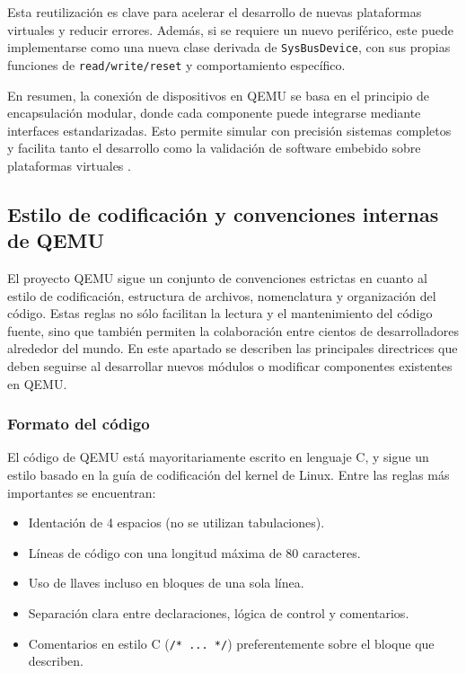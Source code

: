 Esta reutilización es clave para acelerar el desarrollo de nuevas plataformas virtuales y reducir errores. Además, si se requiere un nuevo periférico, este puede implementarse como una nueva clase derivada de \texttt{SysBusDevice}, con sus propias funciones de \texttt{read/write/reset} y comportamiento específico.

\vspace{1em}
En resumen, la conexión de dispositivos en QEMU se basa en el principio de encapsulación modular, donde cada componente puede integrarse mediante interfaces estandarizadas. Esto permite simular con precisión sistemas completos y facilita tanto el desarrollo como la validación de software embebido sobre plataformas virtuales \cite{zabolotny2021daq}.

\subsection{Estilo de codificación y convenciones internas de QEMU}
\label{subsec:convenciones-qemu}

El proyecto QEMU sigue un conjunto de convenciones estrictas en cuanto al estilo de codificación, estructura de archivos, nomenclatura y organización del código. Estas reglas no sólo facilitan la lectura y el mantenimiento del código fuente, sino que también permiten la colaboración entre cientos de desarrolladores alrededor del mundo. En este apartado se describen las principales directrices que deben seguirse al desarrollar nuevos módulos o modificar componentes existentes en QEMU.

\subsubsection*{Formato del código}

El código de QEMU está mayoritariamente escrito en lenguaje C, y sigue un estilo basado en la guía de codificación del kernel de Linux. Entre las reglas más importantes se encuentran:

\begin{itemize}
  \item Identación de 4 espacios (no se utilizan tabulaciones).
  \item Líneas de código con una longitud máxima de 80 caracteres.
  \item Uso de llaves incluso en bloques de una sola línea.
  \item Separación clara entre declaraciones, lógica de control y comentarios.
  \item Comentarios en estilo C (\texttt{/* ... */}) preferentemente sobre el bloque que describen.
\end{itemize}

